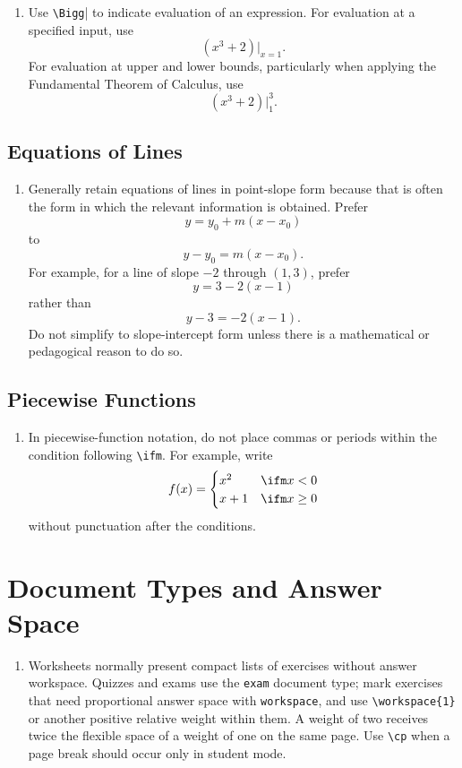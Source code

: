 \documentclass[document,notitlepage]{mhdocument}
\begin{document}
\begin{enumerate}[resume]
\item Use \verb|\Bigg|| to indicate evaluation of an expression. For evaluation at a specified input, use
\[
\left(x^3+2\right)\Bigg|_{x=1}.
\]
For evaluation at upper and lower bounds, particularly when applying the Fundamental Theorem of Calculus, use
\[
\left(x^3+2\right)\Bigg|_1^3.
\]
\end{enumerate}

\subsection{Equations of Lines}

\begin{enumerate}[resume]
\item Generally retain equations of lines in point-slope form because that is often the form in which the relevant information is obtained. Prefer
\[
y=y_0+m(x-x_0)
\]
to
\[
y-y_0=m(x-x_0).
\]
For example, for a line of slope \(-2\) through \((1,3)\), prefer
\[
y=3-2(x-1)
\]
rather than
\[
y-3=-2(x-1).
\]
Do not simplify to slope-intercept form unless there is a mathematical or pedagogical reason to do so.
\end{enumerate}

\subsection{Piecewise Functions}

\begin{enumerate}[resume]
\item In piecewise-function notation, do not place commas or periods within the condition following \verb|\ifm|. For example, write
\[
f(x)=
\begin{cases}
x^2 & \ifm x<0 \\
x+1 & \ifm x\geq0
\end{cases}
\]
without punctuation after the conditions.
\end{enumerate}



\section{Document Types and Answer Space}
\begin{enumerate}[resume]
\item Worksheets normally present compact lists of exercises without answer workspace. Quizzes and exams use the \texttt{exam} document type; mark exercises that need proportional answer space with \texttt{workspace}, and use \verb|\workspace{1}| or another positive relative weight within them. A weight of two receives twice the flexible space of a weight of one on the same page. Use \verb|\cp| when a page break should occur only in student mode.
\end{enumerate}
\end{document}
